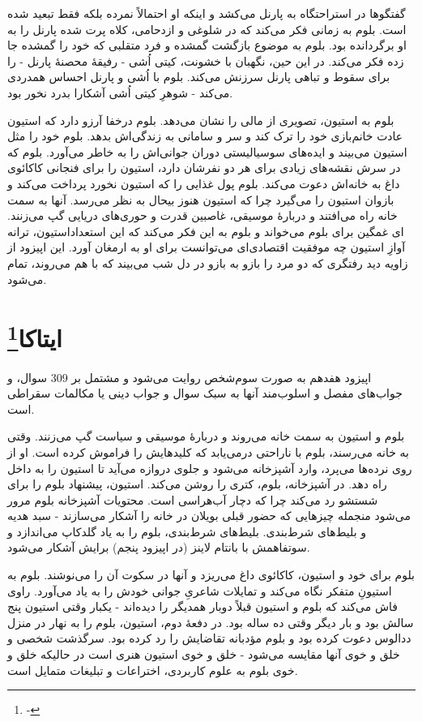 \documentclass[12pt]{book}
\begin{document}
    گفتگوها در استراحتگاه به پارنل می‌کشد و اینکه او احتمالاً نمرده بلکه فقط تبعید شده است. بلوم به زمانی فکر می‌کند که در شلوغی و ازدحامی، کلاه پرت شده پارنل را به او برگردانده بود. بلوم به موضوع بازگشت گمشده و فرد متقلبی که خود را گمشده جا زده فکر می‌کند. در این حین، نگهبان با خشونت، کیتی اُشی - رفیقۀ محصنۀ پارنل - را برای سقوط و تباهی پارنل سرزنش می‌کند. بلوم با اُشی و پارنل احساس همدردی می‌کند - شوهرِ کیتی اُشی آشکارا بدرد نخور بود.

    بلوم به استیون، تصویری از مالی را نشان می‌دهد. بلوم درخفا آرزو دارد که استیون عادت خانم‌بازی خود را ترک کند و سر و سامانی به زندگی‌اش بدهد. بلوم خود را مثل استیون می‌بیند و ایده‌های سوسیالیستی دوران جوانی‌اش را به خاطر می‌آورد. بلوم که در سرش نقشه‌های زیادی برای هر دو نفرشان دارد، استیون را برای فنجانی کاکائوی داغ به خانه‌اش دعوت می‌کند. بلوم پول غذایی را که استیون نخورد پرداخت می‌کند و بازوان استیون را می‌گیرد چرا که استیون هنوز بیحال به نظر می‌رسد. آنها به سمت خانه راه می‌افتند و دربارۀ موسیقی، غاصبین قدرت و حوری‌های دریایی گپ می‌زنند. استیون، ترانه‎‌ای غمگین برای بلوم می‌خواند و بلوم به این فکر می‌کند که این استعداد آوازِ استیون چه موفقیت اقتصادی‌ای می‌توانست برای او به ارمغان آورد. این اپیزود از زاویه دید رفتگری که دو مرد را بازو به بازو در دل شب می‌بیند که با هم می‌روند، تمام می‌شود.

    \chapter[ایتاکا]{ایتاکا\protect\footnote{-}}\label{ep:17}
    اپیزود هفدهم به صورت سوم‌شخص روایت می‌شود و مشتمل بر 309 سوال، و جواب‌های مفصل و اسلوب‌مند آنها به سبک سوال و جواب دینی یا مکالمات سقراطی است.

    بلوم و استیون به سمت خانه می‌روند و دربارۀ موسیقی و سیاست گپ می‌زنند. وقتی به خانه می‌رسند، بلوم با ناراحتی درمی‌یابد که کلیدهایش را فراموش کرده است. او از روی نرده‌ها می‌پرد، وارد آشپزخانه می‌شود و جلوی دروازه می‌آید تا استیون را به داخل راه دهد. در آشپزخانه، بلوم، کتری را روشن می‌کند. استیون، پیشنهاد بلوم را برای شستشو رد می‌کند چرا که دچار آب‌هراسی است. محتویات آشپزخانه بلوم مرور می‌شود منجمله چیزهایی که حضور قبلی بویلان در خانه را آشکار می‌سازند - سبد هدیه و بلیط‌های شرط‌بندی. بلیط‌های شرط‌بندی، بلوم را به یاد گلدکاپ می‌اندازد و سوتفاهمش با بانتام لاینز (در اپیزود پنجم) برایش آشکار می‌شود.

    بلوم برای خود و استیون، کاکائوی داغ می‌ریزد و آنها در سکوت آن را می‌نوشند. بلوم به استیونِ متفکر نگاه می‌کند و تمایلات شاعریِ جوانی خودش را به یاد می‌آورد. راوی فاش می‌کند که بلوم و استیون قبلاً دوبار همدیگر را دیده‌اند - یکبار وقتی استیون پنج سالش بود و بار دیگر وقتی ده ساله بود. در دفعۀ دوم، استیون، بلوم را به نهار در منزل ددالوس دعوت کرده بود و بلوم مؤدبانه تقاضایش را رد کرده بود. سرگذشت شخصی و خلق و خوی آنها مقایسه می‌شود - خلق و خوی استیون هنری است در حالیکه خلق و خوی بلوم به علوم کاربردی، اختراعات و تبلیغات متمایل است.
\end{document}
